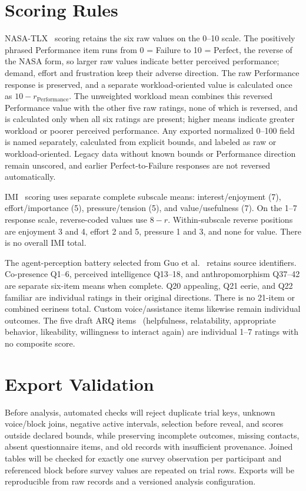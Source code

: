 \section{Scoring Rules}
NASA-TLX~\cite{hart1988nasatlx} scoring retains the six raw values on the 0--10 scale. The positively phrased Performance item runs from 0 = Failure to 10 = Perfect, the reverse of the NASA form, so larger raw values indicate better perceived performance; demand, effort and frustration keep their adverse direction. The raw Performance response is preserved, and a separate workload-oriented value is calculated once as $10-r_{\mathrm{Performance}}$. The unweighted workload mean combines this reversed Performance value with the other five raw ratings, none of which is reversed, and is calculated only when all six ratings are present; higher means indicate greater workload or poorer perceived performance. Any exported normalized 0--100 field is named separately, calculated from explicit bounds, and labeled as raw or workload-oriented. Legacy data without known bounds or Performance direction remain unscored, and earlier Perfect-to-Failure responses are not reversed automatically.

IMI~\cite{ryan1982control,mcauley1989imi} scoring uses separate complete subscale means: interest/enjoyment (7), effort/importance (5), pressure/tension (5), and value/usefulness (7). On the 1--7 response scale, reverse-coded values use $8-r$. Within-subscale reverse positions are enjoyment 3 and 4, effort 2 and 5, pressure 1 and 3, and none for value. There is no overall IMI total.

The agent-perception battery selected from Guo et al.~\cite{guo2024doppelganger} retains source identifiers. Co-presence Q1--6, perceived intelligence Q13--18, and anthropomorphism Q37--42 are separate six-item means when complete. Q20 appealing, Q21 eerie, and Q22 familiar are individual ratings in their original directions. There is no 21-item or combined eeriness total. Custom voice/assistance items likewise remain individual outcomes. The five draft ARQ items~\cite{wang2020terrible} (helpfulness, relatability, appropriate behavior, likeability, willingness to interact again) are individual 1--7 ratings with no composite score.

\section{Export Validation}
Before analysis, automated checks will reject duplicate trial keys, unknown voice/block joins, negative active intervals, selection before reveal, and scores outside declared bounds, while preserving incomplete outcomes, missing contacts, absent questionnaire items, and old records with insufficient provenance. Joined tables will be checked for exactly one survey observation per participant and referenced block before survey values are repeated on trial rows. Exports will be reproducible from raw records and a versioned analysis configuration.

